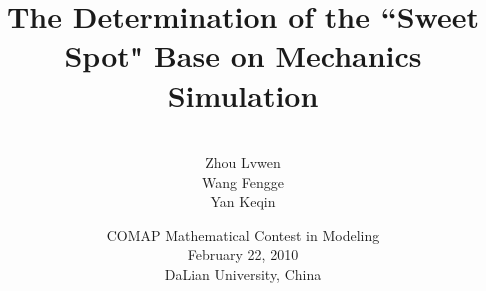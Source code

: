 \documentclass[12pt,a4paper,titlepage]{article}
\begin{document}
\title{The Determination of the ``Sweet Spot" Base on Mechanics Simulation}
\author{\vspace{35pt}\\Zhou Lvwen\\Wang Fengge\\Yan Keqin\\ \vspace{35pt}}
\date{COMAP Mathematical Contest in Modeling\\February 22, 2010\\DaLian University, China}
\maketitle


\newpage\tableofcontents\newpage









\newpage

\newpage

\end{document}
